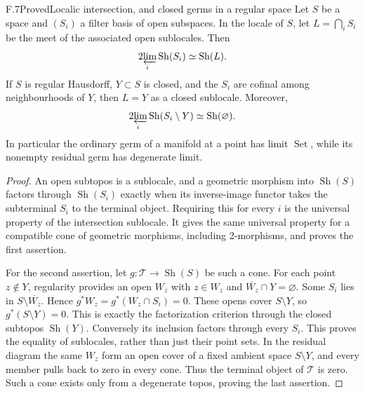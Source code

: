 \begin{statement}{F.7}{Proved}{Localic intersection, and closed germs in a regular space}
Let $S$ be a space and $(S_i)$ a filter basis of open subspaces. In the
locale of $S$, let $L=\bigcap_i S_i$ be the meet of the associated open
sublocales. Then
\[
 \operatorname*{2\!\varprojlim}_i\operatorname{Sh}(S_i)
       \simeq\operatorname{Sh}(L).
\]
If $S$ is regular Hausdorff, $Y\subset S$ is closed, and the $S_i$
are cofinal among neighbourhoods of $Y$, then $L=Y$ as a closed
sublocale. Moreover,
\[
 \operatorname*{2\!\varprojlim}_i\operatorname{Sh}(S_i\setminus Y)
       \simeq\operatorname{Sh}(\varnothing).
\]
In particular the ordinary germ of a manifold at a point has limit
$\operatorname{Set}$, while its nonempty residual germ has degenerate
limit.
\end{statement}
\begin{proof}
An open subtopos is a sublocale, and a geometric morphism into
$\operatorname{Sh}(S)$ factors through $\operatorname{Sh}(S_i)$
exactly when its inverse-image functor takes the subterminal $S_i$
to the terminal object. Requiring this for every $i$ is the universal
property of the intersection sublocale. It gives the same universal
property for a compatible cone of geometric morphisms, including
2-morphisms, and proves the first assertion.

For the second assertion, let $g:\mathcal T\to\operatorname{Sh}(S)$
be such a cone. For each point $z\notin Y$, regularity provides an open
$W_z$ with $z\in W_z$ and $\overline{W_z}\cap Y=\varnothing$.
Some $S_i$ lies in $S\setminus\overline{W_z}$. Hence
$g^*W_z=g^*(W_z\cap S_i)=0$. These opens cover $S\setminus Y$,
so $g^*(S\setminus Y)=0$. This is exactly the factorization criterion
through the closed subtopos $\operatorname{Sh}(Y)$. Conversely its
inclusion factors through every $S_i$. This proves the equality of
sublocales, rather than just their point sets. In the residual diagram
the same $W_z$ form an open cover of a fixed ambient space
$S\setminus Y$, and every member pulls back to zero in every cone.
Thus the terminal object of $\mathcal T$ is zero. Such a cone exists
only from a degenerate topos, proving the last assertion.
\end{proof}

